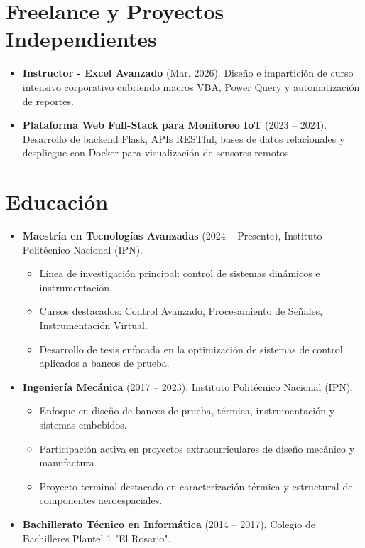 \documentclass[10pt,letterpaper]{article}
\newcommand{\CVItem}[1]{\item #1}
\begin{document}
\section*{Freelance y Proyectos Independientes}
\begin{itemize}[leftmargin=*, itemsep=0pt]
    \CVItem{\textbf{Instructor - Excel Avanzado} (Mar. 2026). Diseño e impartición de curso intensivo corporativo cubriendo macros VBA, Power Query y automatización de reportes.}
    \CVItem{\textbf{Plataforma Web Full-Stack para Monitoreo IoT} (2023 -- 2024). Desarrollo de backend Flask, APIs RESTful, bases de datos relacionales y despliegue con Docker para visualización de sensores remotos.}
\end{itemize}

\section*{Educación}
\begin{itemize}[leftmargin=*, itemsep=0pt]
    \item \textbf{Maestría en Tecnologías Avanzadas} (2024 -- Presente), Instituto Politécnico Nacional (IPN).
    \begin{itemize}[itemsep=0pt]
        \item Línea de investigación principal: control de sistemas dinámicos e instrumentación.
        \item Cursos destacados: Control Avanzado, Procesamiento de Señales, Instrumentación Virtual.
        \item Desarrollo de tesis enfocada en la optimización de sistemas de control aplicados a bancos de prueba.
    \end{itemize}
    \item \textbf{Ingeniería Mecánica} (2017 -- 2023), Instituto Politécnico Nacional (IPN).
    \begin{itemize}[itemsep=0pt]
        \item Enfoque en diseño de bancos de prueba, térmica, instrumentación y sistemas embebidos.
        \item Participación activa en proyectos extracurriculares de diseño mecánico y manufactura.
        \item Proyecto terminal destacado en caracterización térmica y estructural de componentes aeroespaciales.
    \end{itemize}
    \item \textbf{Bachillerato Técnico en Informática} (2014 -- 2017), Colegio de Bachilleres Plantel 1 "El Rosario".
\end{itemize}
\end{document}
